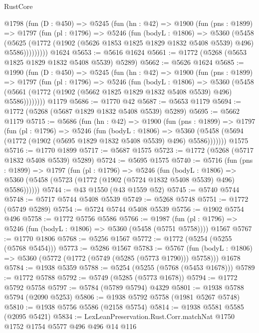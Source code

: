 \begin{lexlean}{RustCore}
\begin{coremodule}
    @1798
      (fun (D : @450) =>
      @5245
        (fun (hn : @42) =>
        @1900
          (fun (pns : @1899) =>
          @1797
            (fun (pl : @1796) =>
            @5246
              (fun (bodyL : @1806) =>
              @5360
                (@5458
                  (@5625
                    (@1772 (@1902 (@5626 @1853 @1825 @1829 @1832 @5408 @5539) @496) @5586)))))))))
    @1624
@5653 := @5616 @1624
@5661 := @1772 (@5268 (@5653 @1825 @1829 @1832 @5408 @5539) @5289)
@5662 := @5626 @1624
@5685 := @1990
    (fun (D : @450) =>
    @5245
      (fun (hn : @42) =>
      @1900
        (fun (pns : @1899) =>
        @1797
          (fun (pl : @1796) =>
          @5246
            (fun (bodyL : @1806) =>
            @5360
              (@5458 (@5661 (@1772 (@1902 (@5662 @1825 @1829 @1832 @5408 @5539) @496) @5586))))))))
    @1179
@5686 := @1770 @42
@5687 := @5653 @1179
@5694 := @1772 (@5268 (@5687 @1829 @1832 @5408 @5539) @5289)
@5695 := @5662 @1179
@5715 := @5686
    (fun (hn : @42) =>
    @1900
      (fun (pns : @1899) =>
      @1797
        (fun (pl : @1796) =>
        @5246
          (fun (bodyL : @1806) =>
          @5360 (@5458 (@5694 (@1772 (@1902 (@5695 @1829 @1832 @5408 @5539) @496) @5586)))))))
    @1575
@5716 := @1770 @1899
@5717 := @5687 @1575
@5723 := @1772 (@5268 (@5717 @1832 @5408 @5539) @5289)
@5724 := @5695 @1575
@5740 := @5716
    (fun (pns : @1899) =>
    @1797
      (fun (pl : @1796) =>
      @5246
        (fun (bodyL : @1806) =>
        @5360 (@5458 (@5723 (@1772 (@1902 (@5724 @1832 @5408 @5539) @496) @5586))))))
@5744 := @43 @1550 (@43 @1559 @52)
@5745 := @5740 @5744
@5748 := @5717 @5744 @5408 @5539
@5749 := @5268 @5748
@5751 := @1772 (@5749 @5289)
@5754 := @5724 @5744 @5408 @5539
@5756 := @1902 @5754 @496
@5758 := @1772 @5756 @5586
@5766 := @1987
    (fun (pl : @1796) => @5246 (fun (bodyL : @1806) => @5360 (@5458 (@5751 @5758))))
    @1567
@5767 := @1770 @1806
@5768 := @5256 @1567
@5772 := @1772 (@5254 (@5255 (@5768 @5454)))
@5773 := @5286 @1567
@5783 := @5767
    (fun (bodyL : @1806) => @5360 (@5772 (@1772 (@5749 (@5285 (@5773 @1790))) @5758)))
    @1678
@5784 := @1938 @5359
@5788 := @5254 (@5255 (@5768 (@5453 @1678)))
@5789 := @1772 @5788
@5792 := @5749 (@5285 (@5773 @1678))
@5794 := @1772 @5792 @5758
@5797 := @5784 (@5789 @5794) @4329
@5801 := @1938 @5788 @5794 (@2090 @5253)
@5806 := @1938 @5792 @5758 (@1981 @5267 @5748)
@5810 := @1938 @5756 @5586 (@2158 @5754)
@5814 := @1938 @5581 @5585 (@2095 @5421)
@5834 := LexLeanPreservation.Rust.Corr.matchNat
    @1750
    @1752
    @1754
    @5577
    @496
    @496
    @14
    @116

\end{coremodule}
\end{lexlean}
